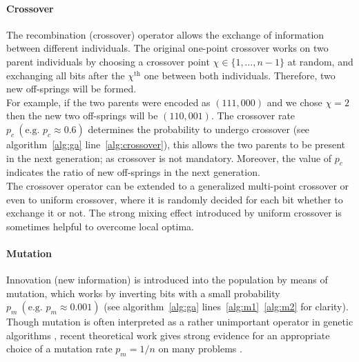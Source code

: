 \documentclass[12pt]{article}
\begin{document}
\paragraph{Crossover}
The recombination (crossover) operator allows the
exchange of information between different individuals.
The original one-point crossover \cite{holland} works on two parent individuals
by choosing a crossover point $ \chi \in \{1, \dots, n-1 \} $
at random, and exchanging all bits after the $ \chi^{\text{th}} $ one
between both individuals.
Therefore, two new off-springs will be formed.\\
For example, if the two parents were encoded as $(111, 000)$ and we chose $\chi = 2$
then the new two off-springs will be $(110, 001)$.
The crossover rate $ p_c \ (\text{e.g. } p_c \approx 0.6) $
determines the probability to undergo crossover (see algorithm~\ref{alg:ga} line~\ref{alg:crossover}),
this allows the two parents to be present in the next generation; as crossover is not mandatory.
Moreover, the value of $p_c$ indicates the ratio of new off-springs in the next generation.\\
The crossover operator can be extended to a generalized
multi-point crossover or even to uniform crossover,
where it is randomly decided for each bit
whether to exchange it or not.
The strong mixing effect introduced by uniform crossover
is sometimes helpful to overcome local optima.

\paragraph{Mutation}
Innovation (new information) is introduced into the
population by means of mutation, which works by inverting
bits with a small probability $p_m \ (\text{e.g. } p_m \approx 0.001)$
(see algorithm~\ref{alg:ga} lines~\ref{alg:m1}~\ref{alg:m2} for clarity).
Though mutation is often interpreted as a rather unimportant operator
in genetic algorithms \cite{holland}, recent theoretical
work gives strong evidence for an appropriate choice of a
mutation rate $ p_m = 1/n $ on many problems \cite{2:misp, 12:misp}.
\end{document}
